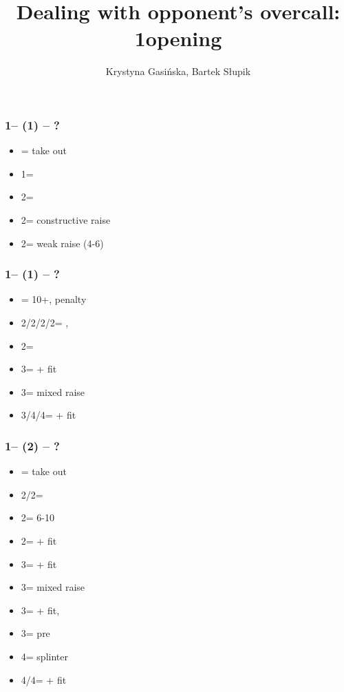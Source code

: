 \documentclass[12pt, a4paper]{article}
\title{Dealing with opponent's overcall: 1\hearts opening}
\author{Krystyna Gasińska, Bartek Słupik}
\begin{document}
\maketitle


\subsubsection*{1\hearts -- (1\spades) -- ?}
\begin{itemize}
    \item \dbl = take out
    \item 1\nt = \clubs
    \item 2\clubs = \diams
    \item 2\diams = constructive raise
    \item 2\hearts = weak raise (4-6)
    

\end{itemize}

\subsubsection*{1\hearts -- (1\nt) -- ?}
\begin{itemize}
    \item \dbl = 10+, penalty
    \item 2\clubs/2\diams/2\hearts/2\spades = \nat, \nf
    \item 2\nt = \minor
    \item 3\clubs = \inv + fit
    \item 3\diams = mixed raise
    \item 3\hearts/4\clubs/4\diams = \nat + fit
\end{itemize}

\subsubsection*{1\spades -- (2\clubs) -- ?}
\begin{itemize}
    \item \dbl = take out
    \item 2\diams/2\hearts = \fonce
    \item 2\spades = 6-10
    \item 2\nt = \gf + fit
    \item 3\clubs = \inv + fit
    \item 3\diams = mixed raise
    \item 3\hearts = \hearts + fit, \inv
    \item 3\spades = pre
    \item 4\clubs = splinter
    \item 4\diams/4\hearts = \nat + fit
\end{itemize}
\end{document}
